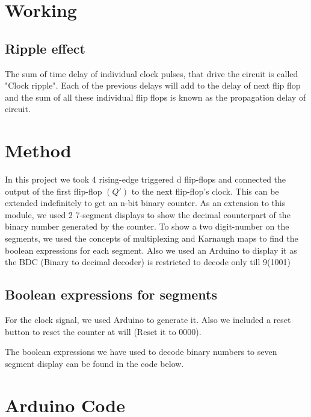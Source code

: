 \documentclass[twoside,twocolumn]{article}
\begin{document}
\section{Working}

\subsection{Ripple effect}

The sum of time delay of individual clock pulses, that drive the circuit is called "Clock ripple".
Each of the previous delays will add to the delay of next flip flop and the sum of all these individual flip flops is known as the propagation delay of circuit.

\section{Method}
In this project we took 4 rising-edge triggered d flip-flops and connected the output of the first flip-flop $(Q')$ to the next flip-flop's clock. This can be extended indefinitely to get an n-bit binary counter.
\newline
As an extension to this module, we used 2 7-segment displays to show the decimal counterpart of the binary number generated by the counter. To show a two digit-number on the segments, we used the concepts of multiplexing and Karnaugh maps to find the boolean expressions for each segment. Also we used an Arduino to display it as the BDC (Binary to decimal decoder) is restricted to decode only till 9(1001)
\subsection{Boolean expressions for segments}   
For the clock signal, we used Arduino to generate it. Also we included a reset button to reset the counter at will (Reset it to 0000).   

The boolean expressions we have used to decode binary numbers to seven segment display can be found in the code below.


\section{Arduino Code}
\end{document}
